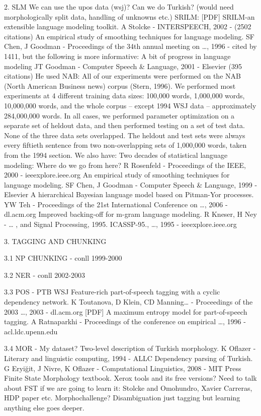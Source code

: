 2. SLM
We can use the upos data (wsj)?
Can we do Turkish?  (would need morphologically split data, handling of unknowns etc.)
SRILM: [PDF] SRILM-an extensible language modeling toolkit. A Stolcke - INTERSPEECH, 2002 - (2502 citations)
An empirical study of smoothing techniques for language modeling. SF Chen, J Goodman - Proceedings of the 34th annual meeting on …, 1996 - cited by 1411, but the following is more informative:
A bit of progress in language modeling JT Goodman - Computer Speech & Language, 2001 - Elsevier (395 citations)
He used NAB:
All of our experiments were performed on the NAB (North American Business news) corpus (Stern, 1996). We performed most experiments at 4 diﬀerent
training data sizes: 100,000 words, 1,000,000 words, 10,000,000 words, and the
whole corpus – except 1994 WSJ data – approximately 284,000,000 words. In
all cases, we performed parameter optimization on a separate set of heldout
data, and then performed testing on a set of test data. None of the three data
sets overlapped. The heldout and test sets were always every ﬁftieth sentence
from two non-overlapping sets of 1,000,000 words, taken from the 1994 section.
  We also have:
Two decades of statistical language modeling: Where do we go from here?  R Rosenfeld - Proceedings of the IEEE, 2000 - ieeexplore.ieee.org
An empirical study of smoothing techniques for language modeling. SF Chen, J Goodman - Computer Speech & Language, 1999 - Elsevier
A hierarchical Bayesian language model based on Pitman-Yor processes.  YW Teh - Proceedings of the 21st International Conference on …, 2006 - dl.acm.org
Improved backing-off for m-gram language modeling.  R Kneser, H Ney - … , and Signal Processing, 1995. ICASSP-95., …, 1995 - ieeexplore.ieee.org

3. TAGGING AND CHUNKING

3.1 NP CHUNKING 
- conll 1999-2000

3.2 NER
- conll 2002-2003

3.3 POS
- PTB WSJ
Feature-rich part-of-speech tagging with a cyclic dependency network. K Toutanova, D Klein, CD Manning… - Proceedings of the 2003 …, 2003 - dl.acm.org
[PDF] A maximum entropy model for part-of-speech tagging.  A Ratnaparkhi - Proceedings of the conference on empirical …, 1996 - acl.ldc.upenn.edu

3.4 MOR
- My dataset?
Two-level description of Turkish morphology.  K Oflazer - Literary and linguistic computing, 1994 - ALLC
Dependency parsing of Turkish. G Eryiğit, J Nivre, K Oflazer - Computational Linguistics, 2008 - MIT Press
Finite State Morphology textbook.
Xerox tools and its free versions?
Need to talk about FST if we are going to learn it:
Stolcke and Omohundro, Xavier Carreras, HDP paper etc.
Morphochallenge?
Disambiguation just tagging but learning anything else goes deeper.

